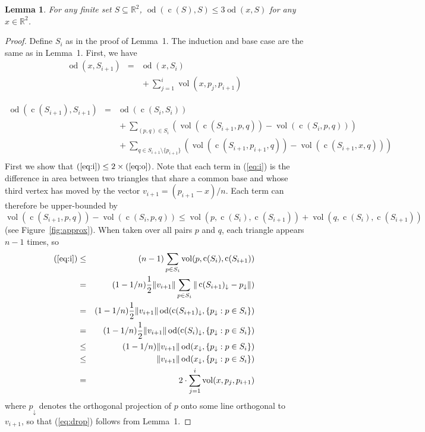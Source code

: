 \documentclass{article}
\newcommand{\R}{\mathbb{R}}
\DeclareMathOperator{\od}{od}
\DeclareMathOperator{\vol}{vol}
\DeclareMathOperator{\cog}{c}
\newtheorem{lem}{Lemma}
\begin{document}
\begin{lem}
For any finite set $S\subseteq\R^2$,
$\od(\cog(S),S) \le 3\od(x,S)$ for any $x\in\R^2$.
\end{lem}

\begin{proof}
Define $S_i$ as in the proof of Lemma~1.  The induction and base case are
the same as in Lemma~1.  First, we have
\begin{eqnarray}
\od(x,S_{i+1}) 
   & = & \od(x,S_i) \\
   && {} + \sum_{j=1}^i \vol(x,p_j,p_{i+1}) \label{eq:o}
\end{eqnarray}

\begin{eqnarray}
\od(\cog(S_{i+1}),S_{i+1}) 
   & = &\od(\cog(S_{i},S_{i})) \\
   &&    {} + \sum_{(p,q)\in S_i} 
           (\vol(\cog(S_{i+1},p,q))- \vol(\cog(S_{i},p,q)))
              \label{eq:i} \\
   &&   {} + \sum_{q\in S_{i+1}\setminus \{p_{i+1}\}}
           (\vol(\cog(S_{i+1},p_{i+1},q))- \vol(\cog(S_{i+1},x,q))) 
            \label{eq:ii} \\
\end{eqnarray}
First we show that $(\ref{eq:i}) \le 2\times (\ref{eq:o})$.  Note that each term in
(\ref{eq:i}) is the difference in area between two triangles that share a
common base and whose third vertex has moved by the vector
$v_{i+1}=(p_{i+1}-x)/n$.  Each term can therefore be upper-bounded by
\[
   \vol(\cog(S_{i+1},p,q))- \vol(\cog(S_{i},p,q))
  \le 
   \vol(p,\cog(S_i),\cog(S_{i+1})) + \vol(q,\cog(S_i),\cog(S_{i+1}))
\]
(see Figure~\ref{fig:approx}). When taken over all pairs $p$ and $q$, each
triangle appears $n-1$ times, so
\begin{eqnarray*}
(\ref{eq:i}) 
   & \le & (n-1)\sum_{p\in S_i} \vol(p,\cog(S_i),\cog(S_{i+1})) \\
   & = & (1-1/n)\frac{1}{2}\|v_{i+1}\|\sum_{p\in
S_i}\|\cog(S_{i+1})_\downarrow-p_\downarrow\|) \\
   & = & (1-1/n)\frac{1}{2}\|v_{i+1}\|\od(\cog(S_{i+1})_\downarrow,
\{p_\downarrow:p\in S_{i}\}) \\
   & = & (1-1/n)\frac{1}{2}\|v_{i+1}\|\od(\cog(S_{i})_\downarrow,
\{p_\downarrow:p\in S_{i}\}) \\
   & \le & (1-1/n)\|v_{i+1}\|\od(x_\downarrow, \{p_\downarrow:p\in S_{i}\})
      \label{eq:drop} \\
   & \le & \|v_{i+1}\|\od(x_\downarrow, \{p_\downarrow:p\in S_{i}\}) \\
   & = & 2\cdot \sum_{j=1}^i \vol(x,p_j,p_{i+1}) 
\end{eqnarray*}
where $p_\downarrow$ denotes the orthogonal projection of $p$ onto some line
orthogonal to $v_{i+1}$, so that (\ref{eq:drop}) follows from Lemma~1.


\end{proof}
\end{document}

